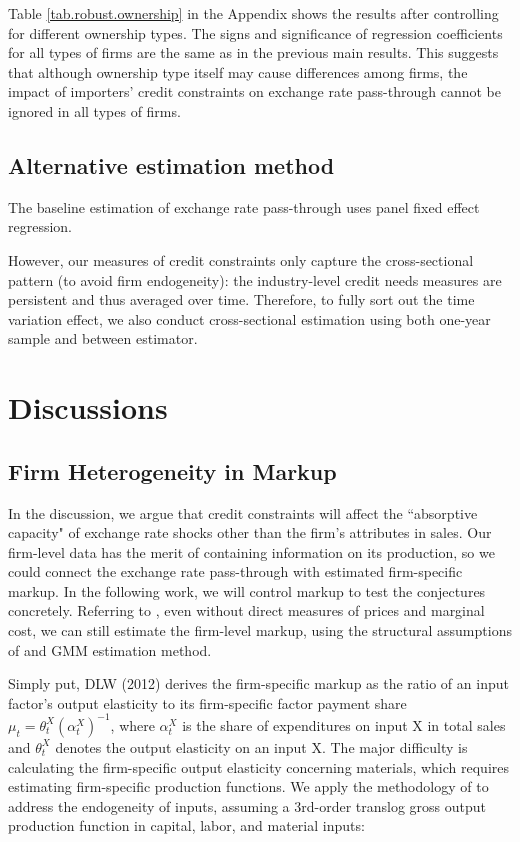 \documentclass[12pt]{article}
\begin{document}
Table \ref{tab.robust.ownership} in the Appendix shows the results after controlling for different ownership types. The signs and significance of regression coefficients for all types of firms are the same as in the previous main results. This suggests that although ownership type itself may cause differences among firms, the impact of importers' credit constraints on exchange rate pass-through cannot be ignored in all types of firms.

\subsection{Alternative estimation method}

The baseline estimation of exchange rate pass-through uses panel fixed effect regression.

However, our measures of credit constraints only capture the cross-sectional pattern (to avoid firm endogeneity): the industry-level credit needs measures are persistent and thus averaged over time. Therefore, to fully sort out the time variation effect, we also conduct cross-sectional estimation using both one-year sample and between estimator.

\section{Discussions} \label{Discussion}

\subsection{Firm Heterogeneity in Markup}
In the discussion, we argue that credit constraints will affect the ``absorptive capacity" of exchange rate shocks other than the firm's attributes in sales. Our firm-level data has the merit of containing information on its production, so we could connect the exchange rate pass-through with estimated firm-specific markup. In the following work, we will control markup to test the conjectures concretely. Referring to \cite{bkl2021}, even without direct measures of prices and marginal cost, we can still estimate the firm-level markup, using the structural assumptions of \cite{dlw2012} and GMM estimation method.

Simply put, DLW (2012)\cite{dlw2012} derives the firm-specific markup as the ratio of an input factor's output elasticity to its firm-specific factor payment share $\mu_{t}=\theta_{t}^{X}\left(\alpha_{t}^{X}\right)^{-1}$, where $\alpha_{t}^{X}$ is the share of expenditures on input X in total sales and $\theta^X_t$ denotes the output elasticity on an input X. The major difficulty is calculating the firm-specific output elasticity concerning materials, which requires estimating firm-specific production functions. We apply the methodology of \cite{acf2015} to address the endogeneity of inputs, assuming a 3rd-order translog gross output production function in capital, labor, and material inputs:
\end{document}
